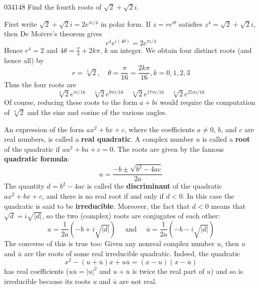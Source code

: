 \begin{example}{}{034148}
Find the fourth roots of $\sqrt{2} + \sqrt{2}i$.


\begin{solution}
  First write $\sqrt{2} + \sqrt{2}i = 2e^{\pi i/4}$ in polar form. If $z = re^{i\theta}$ satisfies $z^{4} = \sqrt{2} + \sqrt{2}i$, then De Moivre's theorem gives
\begin{equation*}
r^4e^{i(4\theta)} = 2e^{\pi i/4}
\end{equation*}
Hence $r^{4} = 2$ and $4\theta = \frac{\pi}{4} + 2k\pi$, $k$ an integer. We obtain four distinct roots (and hence all) by
\begin{equation*}
r = \sqrt[4]{2}, \quad \theta = \frac{\pi}{16} = \frac{2k\pi}{16}, k=0, 1, 2, 3
\end{equation*}
Thus the four roots are
\begin{equation*}
\sqrt[4]{2} e^{\pi i/16} \quad  \sqrt[4]{2} e^{9\pi i/16} \quad \sqrt[4]{2} e^{17 \pi i/16} \quad \sqrt[4]{2} e^{25\pi i/16}
\end{equation*}
Of course, reducing these roots to the form $a + bi$ would require the computation of $\sqrt[4]{2}$
 and the sine and cosine of the various angles.
\end{solution}
\end{example}

An expression of the form $ax^{2} + bx + c$, where the coefficients $a \neq 0$, $b$, and $c$ are real numbers, is called a \textbf{real quadratic}. A complex number $u$ is called a \textbf{root} of the quadratic if $au^{2} + bu + c = 0$. The roots are given by the famous \textbf{quadratic formula}:
\begin{equation*}
u = \frac{-b \pm \sqrt{b^2 - 4ac}}{2a}
\end{equation*}
The quantity $d = b^{2} - 4ac$ is called the \textbf{discriminant} of the quadratic $ax^{2} + bx + c$, and there is no real root if and only if $d < 0$. In this case the quadratic is said to be \textbf{irreducible}. Moreover, the fact that $d < 0$ means that $\sqrt{d} = i\sqrt{|d|}$, so the two (complex) roots are conjugates of each other:
\begin{equation*}
u = \frac{1}{2a}(-b+i\sqrt{|d|}) \quad \mbox{ and } \quad \overline{u} = \frac{1}{2a}(-b-i\sqrt{|d|})
\end{equation*}
The converse of this is true too: Given any nonreal complex number $u$, then $u$ and $\overline{u}$
 are the roots of some real irreducible quadratic. Indeed, the quadratic
\begin{equation*}
x^2 - (u + \overline{u})x + u \overline{u} = (x-u)(x-\overline{u})
\end{equation*}
has real coefficients ($u\overline{u} = |u|^{2}$ and $u + \overline{u}$
 is twice the real part of $u$) and so is irreducible because its roots $u$ and $\overline{u}$
 are not real.



